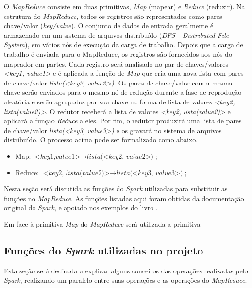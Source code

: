 O \textit{MapReduce} consiste em duas primitivas, \textit{Map} (mapear) e \textit{Reduce} (reduzir). Na estrutura do \textit{MapReduce}, todos os registros são representados como pares chave/valor (\textit{key/value}). O conjunto de dados de entrada geralmente é armazenado em um sistema de arquivos distribuído (\textit{DFS - Distributed File System}), em vários nós de execução da carga de trabalho. Depois que a carga de trabalho  é enviada para o MapReduce, os registros são fornecidos aos nós do mapeador em partes. Cada registro será analisado no par de chaves/valores \textit{<key1, value1>} e é aplicada a função de \textit{Map} que cria uma nova lista com pares de chave/valor \textit{lista(<key2, value2>).} Os pares de chave/valor com a mesma chave serão enviados para o mesmo nó de redução durante a fase de reprodução aleatória e serão agrupados por sua chave na forma de lista de valores \textit{<key2, lista(value2)>}. O redutor receberá a lista de valores \textit{<key2, lista(value2)>} e aplicará a função \textit{Reduce} a eles. Por fim, o redutor produzirá uma lista de pares de chave/valor \textit{lista(<key3, value3>)} e os gravará no sistema de arquivos distribuído. O processo acima pode ser formalizado como abaixo.

\begin{itemize}
\item  Map: $\textit{<key1,value1>} \rightarrow \textit{lista(<key2, value2>)}$;
\item Reduce: $\textit{<key2, lista(value2)>} \rightarrow \textit{lista(<key3, value3>)}$;
\end{itemize}

Nesta seção será discutida as funções do \textit{Spark} utilizadas para substituir as funções no \textit{MapReduce}.   As funções listadas aqui foram obtidas da documentação original do \textit{Spark}\cite{SparkPage}, e apoiado nos exemplos do livro \cite{karau2015learning}.

Em face à primitiva \textit{Map} do \textit{MapReduce} será utilizada a primitiva 

\subsection{Funções do \textit{Spark} utilizadas no projeto}

Esta seção será dedicada a explicar alguns conceitos das operações realizadas pelo \textit{Spark}, realizando um paralelo entre suas operações e as operações do \textit{MapReduce}.

